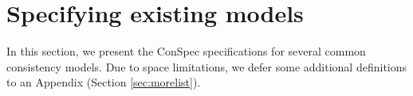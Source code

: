 \documentclass[conference]{IEEEtran}
\begin{document}
	
	\section{Specifying existing models}\label{sec:list}
	In this section, we present the ConSpec specifications for several common
	consistency models. Due to space limitations, we defer some additional definitions to an Appendix (Section \ref{sec:morelist}).
	
\end{document}

